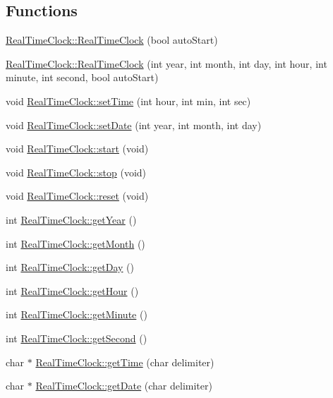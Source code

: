 \subsection*{Functions}
\begin{DoxyCompactItemize}
\item 
\hyperlink{group__group9_ga02c3e799d7541e2917ef46e71146ed90}{RealTimeClock::RealTimeClock} (bool autoStart)
\item 
\hyperlink{group__group9_gaad2bfb64a40a2a2729b569c08e7dcc49}{RealTimeClock::RealTimeClock} (int year, int month, int day, int hour, int minute, int second, bool autoStart)
\item 
void \hyperlink{group__group9_ga14ecce7648b24c7a85359af3f5b20af6}{RealTimeClock::setTime} (int hour, int min, int sec)
\item 
void \hyperlink{group__group9_ga4a5781efbfce128e0d3c461627ce371b}{RealTimeClock::setDate} (int year, int month, int day)
\item 
void \hyperlink{group__group9_gab62814ef94d0fe081e1f8a2756317a3c}{RealTimeClock::start} (void)
\item 
void \hyperlink{group__group9_ga116ebd0f42df71ef71d217527194d867}{RealTimeClock::stop} (void)
\item 
void \hyperlink{group__group9_ga81b09971229ddc88a7581bf5dcab7d1e}{RealTimeClock::reset} (void)
\item 
int \hyperlink{group__group9_ga58d426541706593b83016e0462e41625}{RealTimeClock::getYear} ()
\item 
int \hyperlink{group__group9_gaa8901871334c623b9473216de08c1432}{RealTimeClock::getMonth} ()
\item 
int \hyperlink{group__group9_ga29dbb224e31f5dca34c29e5e48ebeb2c}{RealTimeClock::getDay} ()
\item 
int \hyperlink{group__group9_ga86c10ef9f4da8dbee7fbd6236443fd53}{RealTimeClock::getHour} ()
\item 
int \hyperlink{group__group9_ga9784205a5ea194cca976af6cfee1308b}{RealTimeClock::getMinute} ()
\item 
int \hyperlink{group__group9_gaaddd01287cb8a6d2711b0650f7cbcc72}{RealTimeClock::getSecond} ()
\item 
char $\ast$ \hyperlink{group__group9_gaad4ca0e261b2a594e536303dee1116f4}{RealTimeClock::getTime} (char delimiter)
\item 
char $\ast$ \hyperlink{group__group9_gaa11261523ee392adf9081def9e3b1fcd}{RealTimeClock::getDate} (char delimiter)
\end{DoxyCompactItemize}


